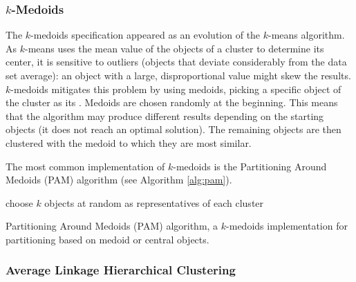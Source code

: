 \subsubsection*{$k$-Medoids}

The $k$-medoids specification appeared as an evolution of the $k$-means
algorithm. As $k$-means uses the mean value of the objects of a cluster to
determine its center, it is sensitive to outliers (objects that deviate
considerably from the data set average): an object with a large, disproportional
value might skew the results. $k$-medoids mitigates this problem by using
medoids, picking a specific object of the cluster as its 
\cite{han2006data}. Medoids are chosen randomly at the beginning. This means
that the algorithm may produce different results depending on the starting
objects (it does not reach an optimal solution). The remaining objects are then
clustered with the medoid to which they are most similar.

The most common implementation of $k$-medoids is the Partitioning Around
Medoids (PAM) algorithm (see Algorithm \ref{alg:pam}).

\begin{algorithm}
  \BlankLine

  choose $k$ objects at random as representatives of each cluster\;
  \BlankLine

  \caption[Partitioning Around Medoids (PAM) algorithm]{
    Partitioning Around Medoids (PAM) algorithm, a $k$-medoids implementation
    for partitioning based on medoid or central objects.
  }
  \label{alg:pam}
\end{algorithm}

\subsubsection*{Average Linkage Hierarchical Clustering}


